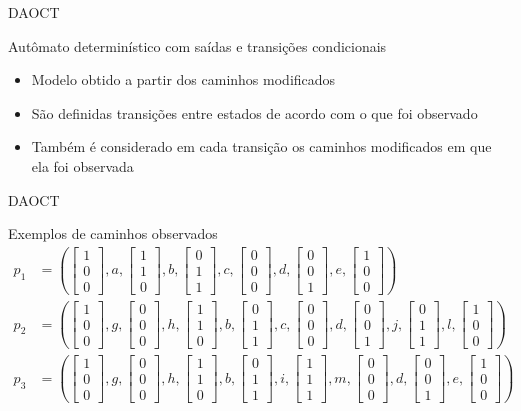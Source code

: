 \documentclass[xcolor=x11names,compress,framenumber]{beamer}
\newcommand{\colvector}[3]{\left[ \begin{array}{c}
		#1 \\ #2 \\ #3
	\end{array}\right]}
\renewcommand{\(}{\begin{columns}}
\renewcommand{\)}{\end{columns}}
\newcommand{\<}[1]{\begin{column}{#1}}
\renewcommand{\>}{\end{column}}
\begin{document}

\begin{frame}{DAOCT}
	\begin{block}{Autômato determinístico com saídas e transições condicionais}
		\begin{itemize}
			\item Modelo obtido a partir dos caminhos modificados
			\item São definidas transições entre estados de acordo com o que foi observado
			\item Também é considerado em cada transição os caminhos modificados em que ela foi observada
		\end{itemize}
	\end{block}
\end{frame}

\begin{frame}{DAOCT}
\begin{block}{Exemplos de caminhos observados}\tiny
	\begin{align*} 
	p_1&= \left( \colvector{1}{0}{0},a,\colvector{1}{1}{0},b,\colvector{0}{1}{1},c,\colvector{0}{0}{0},d,\colvector{0}{0}{1},e,\colvector{1}{0}{0}\right)\\
	p_2&= \left( \colvector{1}{0}{0},g,\colvector{0}{0}{0},h,\colvector{1}{1}{0},b,\colvector{0}{1}{1},c,\colvector{0}{0}{0},d,\colvector{0}{0}{1},j,\colvector{0}{1}{1},l,\colvector{1}{0}{0}\right)\\
	p_3&= \left( \colvector{1}{0}{0},g,\colvector{0}{0}{0},h,\colvector{1}{1}{0},b,\colvector{0}{1}{1},i,\colvector{1}{1}{1},m,\colvector{0}{0}{0},d,\colvector{0}{0}{1},e,\colvector{1}{0}{0}\right)
	\end{align*}
\end{block}
\end{frame}
\end{document}
